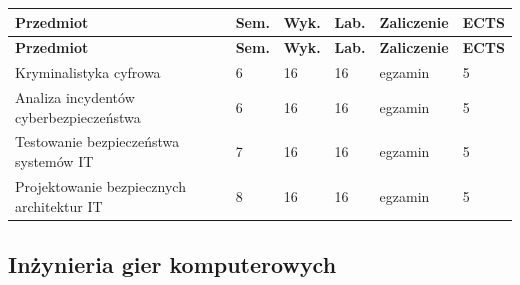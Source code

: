 \documentclass[12pt,a4paper]{article}
\newcommand{\thdrule}{\noalign{\global\setlength{\extrarowheight}{0pt}}}
\newcommand{\thdend}{\noalign{\global\setlength{\extrarowheight}{4pt}}}
\begin{document}
{\scriptsize
\begin{longtable}{m{6.5cm}m{0.7cm}m{1cm}m{1cm}m{1.7cm}m{0.7cm}}
\thdrule\toprule
\rowcolor{pjatkRed}
{\color{white}\footnotesize\textbf{\vphantom{Ag}Przedmiot}} & {\color{white}\footnotesize\textbf{\vphantom{Ag}Sem.}} & {\color{white}\footnotesize\textbf{\vphantom{Ag}Wyk.}} & {\color{white}\footnotesize\textbf{\vphantom{Ag}Lab.}} & {\color{white}\footnotesize\textbf{\vphantom{Ag}Zaliczenie}} & {\color{white}\footnotesize\textbf{\vphantom{Ag}ECTS}} \\
\midrule\thdend
\endfirsthead
\thdrule\toprule
\rowcolor{pjatkRed}
{\color{white}\footnotesize\textbf{\vphantom{Ag}Przedmiot}} & {\color{white}\footnotesize\textbf{\vphantom{Ag}Sem.}} & {\color{white}\footnotesize\textbf{\vphantom{Ag}Wyk.}} & {\color{white}\footnotesize\textbf{\vphantom{Ag}Lab.}} & {\color{white}\footnotesize\textbf{\vphantom{Ag}Zaliczenie}} & {\color{white}\footnotesize\textbf{\vphantom{Ag}ECTS}} \\
\midrule\thdend
\endhead
\rowcolor{tableRowLight} Kryminalistyka cyfrowa & 6 & 16 & 16 & {\scriptsize egzamin} & 5 \\
\rowcolor{tableRowAlt} Analiza incydentów cyberbezpieczeństwa & 6 & 16 & 16 & {\scriptsize egzamin} & 5 \\
\rowcolor{tableRowLight} Testowanie bezpieczeństwa systemów IT & 7 & 16 & 16 & {\scriptsize egzamin} & 5 \\
\rowcolor{tableRowAlt} Projektowanie bezpiecznych architektur IT & 8 & 16 & 16 & {\scriptsize egzamin} & 5 \\
\bottomrule
\end{longtable}}

\subsection*{Inżynieria gier komputerowych}
\end{document}
